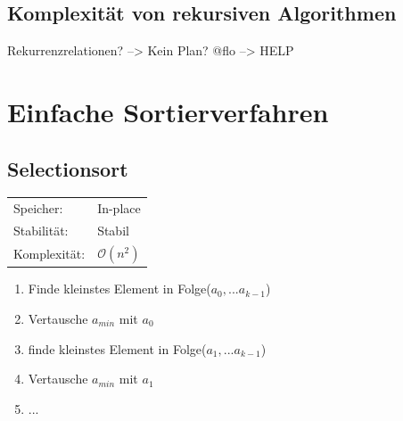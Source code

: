 \documentclass[12pt,a4paper]{article}
\begin{document}
\subsection{Komplexität von rekursiven Algorithmen}
Rekurrenzrelationen? --> Kein Plan? @flo --> HELP

\section{Einfache Sortierverfahren}
\subsection{Selectionsort}
\begin{tabularx}{\textwidth}{l l}
	Speicher: &In-place\\
	Stabilität: &Stabil\\
	Komplexität: &$\mathcal{O}(n^2)$\\
\end{tabularx}
\vspace{.8cm}
\newline
\begin{minipage}[c]{0.7\textwidth}
	\begin{enumerate}
		\item Finde kleinstes Element in Folge($a_0, ...a_{k-1}$)
		\item Vertausche $a_{min}$ mit $a_0$
		\item finde kleinstes Element in Folge($a_1, ...a_{k-1}$)
		\item Vertausche $a_{min}$ mit $a_1$
		\item ...
	\end{enumerate}
\end{minipage}
\end{document}
